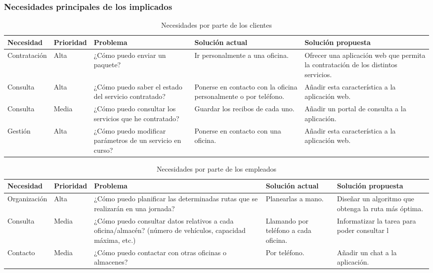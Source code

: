 \documentclass[12pt,spanish]{article}
\begin{document}
\subsubsection{Necesidades principales de los implicados}
\begin{table}[H]
	\begin{center}
	\begin{tabular}{|l|l|m{3cm}|m{2.75cm}|m{3.25cm}|}
			\hline
			\textbf{Necesidad} & \textbf{Prioridad} & \textbf{Problema} & \textbf{Solución actual} & \textbf{Solución propuesta }\\
			\hline
			Contratación & Alta & ¿Cómo puedo enviar un paquete? & Ir personalmente a una oficina. & Ofrecer una aplicación web que permita la contratación de los distintos servicios. \\
			\hline
			Consulta & Alta & ¿Cómo puedo saber el estado del servicio contratado? & Ponerse en contacto con la oficina personalmente o por teléfono. & Añadir esta característica a la aplicación web. \\
			\hline
			Consulta & Media & ¿Cómo puedo consultar los servicios que he contratado? & Guardar los recibos de cada uno. & Añadir un portal de consulta a la aplicación. \\
			\hline
			Gestión & Alta & ¿Cómo puedo modificar parámetros de un servicio en curso? & Ponerse en contacto con una oficina. & Añadir esta característica a la aplicación web. \\
			\hline
	\end{tabular}
	\caption{Necesidades por parte de los clientes}
\end{center}
\end{table}

\begin{table}[H]
\begin{center}
	\begin{tabular}{|l|l|m{3cm}|m{2.75cm}|m{3.25cm}|}
\hline
\textbf{Necesidad} & \textbf{Prioridad} & \textbf{Problema} & \textbf{Solución actual} & \textbf{Solución propuesta }\\
\hline
Organización & Alta & ¿Cómo puedo planificar las determinadas rutas que se realizarán en una jornada? & Planearlas a mano. & Diseñar un algoritmo que obtenga la ruta más óptima. \\
\hline
Consulta & Media & ¿Cómo puedo consultar datos relativos a cada oficina/almacén? (número de vehículos, capacidad máxima, etc.) & Llamando por teléfono a cada oficina. & Informatizar la tarea para poder consultar l \\
\hline
Contacto & Media & ¿Cómo puedo contactar con otras oficinas o almacenes? & Por teléfono. & Añadir un chat a la aplicación. \\
\hline
\end{tabular}
\caption{Necesidades por parte de los empleados}
\end{center}
\end{table}
\end{document}
